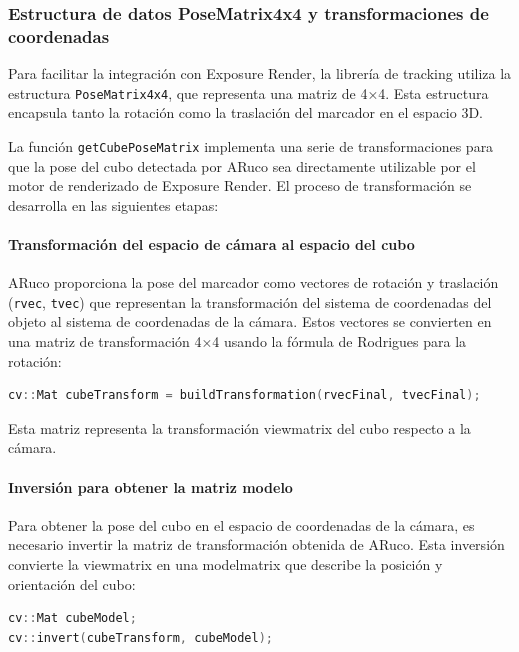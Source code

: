 \subsubsection{Estructura de datos PoseMatrix4x4 y transformaciones de coordenadas}

Para facilitar la integración con Exposure Render, la librería de tracking utiliza la estructura \texttt{PoseMatrix4x4}, que representa una matriz de 4×4. Esta estructura encapsula tanto la rotación como la traslación del marcador en el espacio 3D.

La función \texttt{getCubePoseMatrix} implementa una serie de transformaciones para que la pose del cubo detectada por ARuco sea directamente utilizable por el motor de renderizado de Exposure Render. El proceso de transformación se desarrolla en las siguientes etapas:

\paragraph{Transformación del espacio de cámara al espacio del cubo}
ARuco proporciona la pose del marcador como vectores de rotación y traslación (\texttt{rvec}, \texttt{tvec}) que representan la transformación del sistema de coordenadas del objeto al sistema de coordenadas de la cámara. Estos vectores se convierten en una matriz de transformación 4×4 usando la fórmula de Rodrigues para la rotación:

\begin{lstlisting}[language=C++]
cv::Mat cubeTransform = buildTransformation(rvecFinal, tvecFinal);
\end{lstlisting}

Esta matriz representa la transformación \gls{viewmatrix} del cubo respecto a la cámara.

\paragraph{Inversión para obtener la matriz modelo}
Para obtener la pose del cubo en el espacio de coordenadas de la cámara, es necesario invertir la matriz de transformación obtenida de ARuco. Esta inversión convierte la \gls{viewmatrix} en una \gls{modelmatrix} que describe la posición y orientación del cubo:

\begin{lstlisting}[language=C++]
cv::Mat cubeModel;
cv::invert(cubeTransform, cubeModel);
\end{lstlisting}

